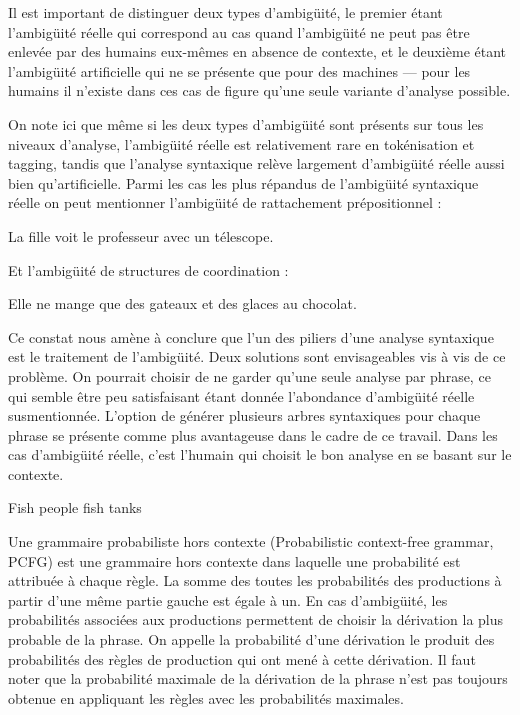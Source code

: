 \documentclass[12pt]{article}
\begin{document}
Il est important de distinguer deux types d'ambig\"uit\'e, le
premier \'etant l'ambig\"uit\'e r\'eelle qui correspond au cas quand l'ambig\"uit\'e
ne peut pas \^etre enlev\'ee par des humains eux-m\^emes en absence de contexte,
et le deuxi\`eme \'etant l'ambig\"uit\'e artificielle qui ne se pr\'esente que pour des machines --- pour les humains il n'existe dans ces cas de figure qu'une seule variante d'analyse possible.

On note ici que m\^eme si les deux types d'ambig\"uit\'e sont pr\'esents sur tous les niveaux d'analyse, l'ambig\"uit\'e r\'eelle est relativement rare en tok\'enisation et tagging, tandis que l'analyse syntaxique
rel\`eve largement d'ambig\"uit\'e r\'eelle aussi bien qu'artificielle. Parmi les cas les plus r\'epandus de l'ambig\"uit\'e syntaxique r\'eelle on peut mentionner l'ambig\"uit\'e de rattachement pr\'epositionnel : 

\begin{exe}
\ex La fille voit le professeur avec un t\'elescope.
\end{exe}

Et l'ambig\"uit\'e de structures de coordination :

\begin{exe}
\ex Elle ne mange que des gateaux et des glaces au chocolat.
\end{exe}

Ce constat nous am\`ene \`a conclure que l'un des piliers d'une
analyse syntaxique est le traitement de l'ambig\"uit\'e. Deux solutions sont
envisageables vis \`a vis de ce probl\`eme. On pourrait choisir de ne garder
qu'une seule analyse par phrase, ce qui semble \^etre peu satisfaisant \'etant
donn\'ee l'abondance d'ambig\"uit\'e r\'eelle susmentionn\'ee. L'option de
g\'en\'erer plusieurs arbres syntaxiques pour chaque phrase se pr\'esente comme
plus avantageuse dans le cadre de ce travail. Dans les cas d'ambig\"uit\'e
r\'eelle, c'est l'humain qui choisit le bon analyse en se basant sur le
contexte.

\begin{exe}
\ex Fish people fish tanks
\end{exe}

Une grammaire probabiliste hors contexte (Probabilistic context-free grammar,
PCFG) est une grammaire hors contexte dans laquelle une probabilit\'e est
attribu\'ee \`a chaque r\`egle. La somme des toutes les probabilit\'es des
productions \`a partir d'une m\^eme partie gauche est \'egale \`a un. 
En cas d'ambig\"uit\'e, les probabilit\'es associ\'ees aux productions permettent
de choisir la d\'erivation la plus probable de la phrase. On appelle la
probabilit\'e d'une d\'erivation le produit des probabilit\'es des r\`egles de
production qui ont men\'e \`a cette d\'erivation. Il faut noter que la
probabilit\'e maximale de la d\'erivation de la phrase n'est pas toujours obtenue
en appliquant les r\`egles avec les probabilit\'es maximales.
\end{document}
